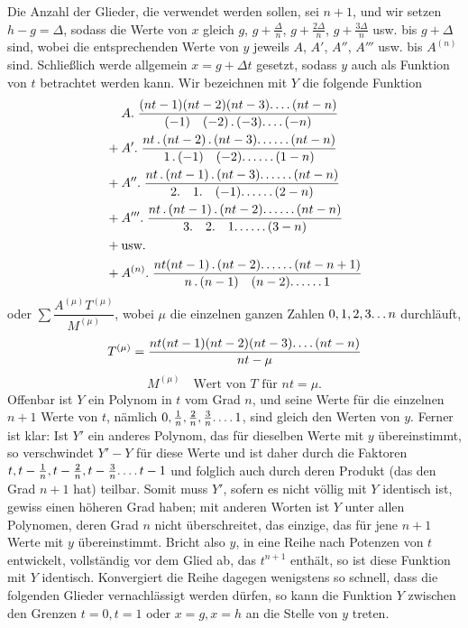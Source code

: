 Die Anzahl der Glieder, die verwendet werden sollen, sei $n+1$, und wir setzen $h-g=\Delta$, sodass die Werte von $x$ gleich $g$, $g+\frac{\Delta}{n}$, $g+\frac{2\Delta}{n}$, $g+\frac{3\Delta}{n}$ usw. bis $g+\Delta$ sind, wobei die entsprechenden Werte von $y$ jeweils $A$, $A'$, $A''$, $A'''$ usw. bis $A^{(n)}$ sind. Schließlich werde allgemein $x=g+\Delta t$ gesetzt, sodass $y$ auch als Funktion von $t$ betrachtet werden kann. Wir bezeichnen mit $Y$ die folgende Funktion
\[
\begin{aligned}
&A.\;\frac{(nt-1)(nt-2)(nt-3)\ldotp\ldotp\ldotp\ldotp(nt-n)}{(-1)\quad(-2)\, .\,(-3)\ldotp\ldotp\ldotp\ldotp(-n)}\\
{}+{}&A'.\;\frac{nt\, .\,(nt-2)\, .\,(nt-3)\ldotp\ldotp\ldotp\ldotp\ldotp\ldotp(nt-n)}{1\, .\,(-1)\quad(-2)\ldotp\ldotp\ldotp\ldotp\ldotp\ldotp(1-n)}\\
{}+{}&A''.\;\frac{nt\, .\,(nt-1)\, .\,(nt-3)\ldotp\ldotp\ldotp\ldotp\ldotp\ldotp(nt-n)}{2.\quad1.\quad(-1)\ldotp\ldotp\ldotp\ldotp\ldotp\ldotp(2-n)}\\
{}+{}&A'''.\;\frac{nt\, .\,(nt-1)\, .\,(nt-2)\ldotp\ldotp\ldotp\ldotp\ldotp\ldotp(nt-n)}{3.\quad2.\quad1\ldotp\ldotp\ldotp\ldotp\ldotp\ldotp(3-n)}\\
{}+{}&\text{usw.}\\
{}+{}&A^{(n)}.\;\frac{nt(nt-1)\, .\,(nt-2)\ldotp\ldotp\ldotp\ldotp\ldotp\ldotp(nt-n+1)}{n\, .\,(n-1)\quad(n-2)\ldotp\ldotp\ldotp\ldotp\ldotp\ldotp1}
\end{aligned}
\]
oder $\sum\dfrac{A^{(\mu)}T^{(\mu)}}{M^{(\mu)}}$, wobei $\mu$ die einzelnen ganzen Zahlen $0,1,2,3\ldotp\ldotp\ldotp n$ durchläuft,
\[
T^{(\mu)}=\frac{nt(nt-1)(nt-2)(nt-3)\ldotp\ldotp\ldotp\ldotp(nt-n)}{nt-\mu}
\]
\[
M^{(\mu)}\quad\text{Wert von }T\text{ für }nt=\mu.
\]
Offenbar ist $Y$ ein Polynom in $t$ vom Grad $n$, und seine Werte für die einzelnen $n+1$ Werte von $t$, nämlich $0,\frac1n,\frac2n,\frac3n\ldotp\ldotp\ldotp\ldotp1$, sind gleich den Werten von $y$. Ferner ist klar: Ist $Y'$ ein anderes Polynom, das für dieselben Werte mit $y$ übereinstimmt, so verschwindet $Y'-Y$ für diese Werte und ist daher durch die Faktoren $t,t-\frac1n,t-\frac2n,t-\frac3n\ldotp\ldotp\ldotp\ldotp t-1$ und folglich auch durch deren Produkt (das den Grad $n+1$ hat) teilbar. Somit muss $Y'$, sofern es nicht völlig mit $Y$ identisch ist, gewiss einen höheren Grad haben; mit anderen Worten ist $Y$ unter allen Polynomen, deren Grad $n$ nicht überschreitet, das einzige, das für jene $n+1$ Werte mit $y$ übereinstimmt. Bricht also $y$, in eine Reihe nach Potenzen von $t$ entwickelt, vollständig vor dem Glied ab, das $t^{n+1}$ enthält, so ist diese Funktion mit $Y$ identisch. Konvergiert die Reihe dagegen wenigstens so schnell, dass die folgenden Glieder vernachlässigt werden dürfen, so kann die Funktion $Y$ zwischen den Grenzen $t=0,t=1$ oder $x=g,x=h$ an die Stelle von $y$ treten.

